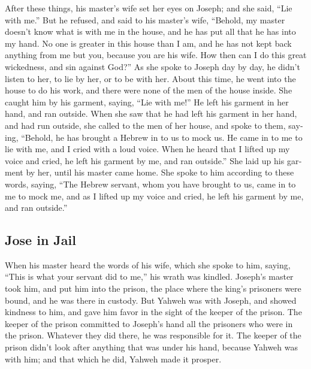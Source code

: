 \begin{paracol}{2}
\begin{otherlanguage}{english}
 After these things, his master's wife set her eyes on
Joseph; and she said, ``Lie with me.''  But he refused,
and said to his master's wife, ``Behold, my master doesn't know what is
with me in the house, and he has put all that he has into my hand.
 No one is greater in this house than I am, and he has not
kept back anything from me but you, because you are his wife. How then
can I do this great wickedness, and sin against God?'' 
As she spoke to Joseph day by day, he didn't listen to her, to lie by
her, or to be with her.  About this time, he went into
the house to do his work, and there were none of the men of the house
inside.  She caught him by his garment, saying, ``Lie
with me!'' He left his garment in her hand, and ran outside.
 When she saw that he had left his garment in her hand,
and had run outside,  she called to the men of her house,
and spoke to them, saying, ``Behold, he has brought a Hebrew in to us to
mock us. He came in to me to lie with me, and I cried with a loud voice.
 When he heard that I lifted up my voice and cried, he
left his garment by me, and ran outside.''  She laid up
his garment by her, until his master came home.  She
spoke to him according to these words, saying, ``The Hebrew servant,
whom you have brought to us, came in to me to mock me, 
and as I lifted up my voice and cried, he left his garment by me, and
ran outside.''

\hypertarget{jose-in-jail}{%
\subsection{Jose in Jail}\label{jose-in-jail}}

 When his master heard the words of his wife, which she
spoke to him, saying, ``This is what your servant did to me,'' his wrath
was kindled.  Joseph's master took him, and put him into
the prison, the place where the king's prisoners were bound, and he was
there in custody.  But Yahweh was with Joseph, and showed
kindness to him, and gave him favor in the sight of the keeper of the
prison.  The keeper of the prison committed to Joseph's
hand all the prisoners who were in the prison. Whatever they did there,
he was responsible for it.  The keeper of the prison
didn't look after anything that was under his hand, because Yahweh was
with him; and that which he did, Yahweh made it prosper.


\end{otherlanguage}
\end{paracol}
